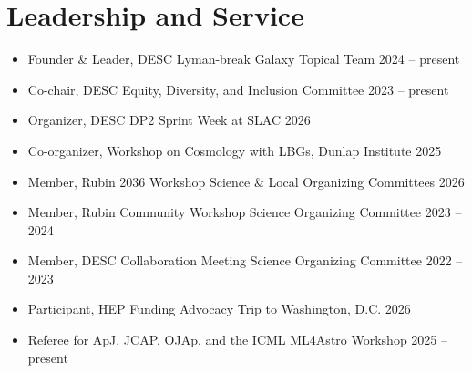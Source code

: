 \section{Leadership and Service}
\begin{itemize}
    \item Founder \& Leader, DESC Lyman-break Galaxy Topical Team \hfill 2024 -- present

    \item Co-chair, DESC Equity, Diversity, and Inclusion Committee \hfill 2023 -- present

    \item Organizer, DESC DP2 Sprint Week at SLAC \hfill 2026

    \item Co-organizer, Workshop on Cosmology with LBGs, Dunlap Institute \hfill 2025

    \item Member, Rubin 2036 Workshop Science \& Local Organizing Committees \hfill 2026

    \item Member, Rubin Community Workshop Science Organizing Committee \hfill 2023 -- 2024

    \item Member, DESC Collaboration Meeting Science Organizing Committee \hfill 2022 -- 2023

    \item Participant, HEP Funding Advocacy Trip to Washington, D.C. \hfill 2026

    \item Referee for ApJ, JCAP, OJAp, and the ICML ML4Astro Workshop \hfill 2025 -- present


\end{itemize}
